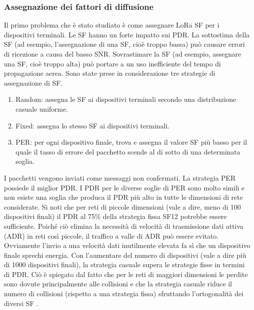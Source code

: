 \documentclass[a4paper]{report} %
\begin{document}
\subsubsection{Assegnazione dei fattori di diffusione}
Il primo problema che è stato studiato è come assegnare LoRa SF per i dispositivi terminali. Le SF hanno un forte impatto sui PDR. La sottostima della SF (ad esempio, l'assegnazione di una SF, cioè troppo bassa) può causare errori di ricezione a causa del basso SNR. Sovrastimare la SF (ad esempio, assegnare una SF, cioè troppo alta) può portare a un uso inefficiente del tempo di propagazione aerea. Sono state prese in considerazione tre strategie di assegnazione di SF.
\begin{enumerate}
\item Random: assegna le SF ai dispositivi terminali secondo una distribuzione casuale uniforme.
\item Fixed: assegna lo stesso SF ai dispositivi terminali.
\item PER: per ogni dispositivo finale, trova e assegna il valore SF più basso per il quale il tasso di errore del pacchetto scende al di sotto di una determinata soglia.
\end{enumerate}
I pacchetti vengono inviati come messaggi non confermati. La strategia PER possiede il miglior PDR. I PDR per le diverse soglie di PER sono molto simili e non esiste una soglia che produca il PDR più alto in tutte le dimensioni di rete considerate. Si noti che per reti di piccole dimensioni (vale a dire, meno di 100 dispositivi finali) il PDR al 75\% della strategia fissa SF12 potrebbe essere sufficiente. Poiché ciò elimina la necessità di velocità di trasmissione dati attiva (ADR) in reti così piccole, il traffico a valle di ADR può essere evitato. Ovviamente l'invio a una velocità dati inutilmente elevata fa sì che un dispositivo finale sprechi energia. Con l'aumentare del numero di dispositivi (vale a dire più di 1000 dispositivi finali), la strategia casuale supera le strategie fisse in termini di PDR. Ciò è spiegato dal fatto che per le reti di maggiori dimensioni le perdite sono dovute principalmente alle collisioni e che la strategia casuale riduce il numero di collisioni (rispetto a una strategia fissa) sfruttando l'ortogonalità dei diversi SF \cite{art:rif.49}.
\end{document}
